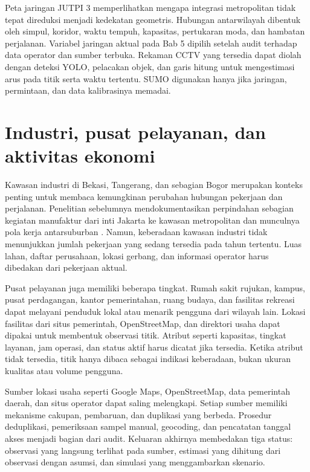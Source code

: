 \documentclass[11pt,a4paper,oneside,openany,indonesian]{report}
\begin{document}
Peta jaringan JUTPI 3 memperlihatkan mengapa integrasi metropolitan tidak tepat direduksi menjadi kedekatan geometris. Hubungan antarwilayah dibentuk oleh simpul, koridor, waktu tempuh, kapasitas, pertukaran moda, dan hambatan perjalanan. Variabel jaringan aktual pada Bab 5 dipilih setelah audit terhadap data operator dan sumber terbuka. Rekaman CCTV yang tersedia dapat diolah dengan deteksi YOLO, pelacakan objek, dan garis hitung untuk mengestimasi arus pada titik serta waktu tertentu. SUMO digunakan hanya jika jaringan, permintaan, dan data kalibrasinya memadai.

\section{Industri, pusat pelayanan, dan aktivitas ekonomi}

Kawasan industri di Bekasi, Tangerang, dan sebagian Bogor merupakan konteks penting untuk membaca kemungkinan perubahan hubungan pekerjaan dan perjalanan. Penelitian sebelumnya mendokumentasikan perpindahan sebagian kegiatan manufaktur dari inti Jakarta ke kawasan metropolitan dan munculnya pola kerja antarsuburban \parencite{hudalahetal2013,permatasarihudalah2013,sadewoetal2023}. Namun, keberadaan kawasan industri tidak menunjukkan jumlah pekerjaan yang sedang tersedia pada tahun tertentu. Luas lahan, daftar perusahaan, lokasi gerbang, dan informasi operator harus dibedakan dari pekerjaan aktual.

Pusat pelayanan juga memiliki beberapa tingkat. Rumah sakit rujukan, kampus, pusat perdagangan, kantor pemerintahan, ruang budaya, dan fasilitas rekreasi dapat melayani penduduk lokal atau menarik pengguna dari wilayah lain. Lokasi fasilitas dari situs pemerintah, OpenStreetMap, dan direktori usaha dapat dipakai untuk membentuk observasi titik. Atribut seperti kapasitas, tingkat layanan, jam operasi, dan status aktif harus dicatat jika tersedia. Ketika atribut tidak tersedia, titik hanya dibaca sebagai indikasi keberadaan, bukan ukuran kualitas atau volume pengguna.

Sumber lokasi usaha seperti Google Maps, OpenStreetMap, data pemerintah daerah, dan situs operator dapat saling melengkapi. Setiap sumber memiliki mekanisme cakupan, pembaruan, dan duplikasi yang berbeda. Prosedur deduplikasi, pemeriksaan sampel manual, geocoding, dan pencatatan tanggal akses menjadi bagian dari audit. Keluaran akhirnya membedakan tiga status: observasi yang langsung terlihat pada sumber, estimasi yang dihitung dari observasi dengan asumsi, dan simulasi yang menggambarkan skenario.
\end{document}
